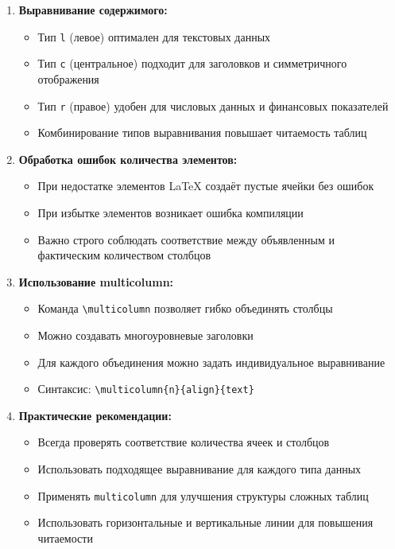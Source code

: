 \documentclass[12pt,a4paper]{article}
\begin{document}
\begin{enumerate}
    \item \textbf{Выравнивание содержимого:}
    \begin{itemize}
        \item Тип \texttt{l} (левое) оптимален для текстовых данных
        \item Тип \texttt{c} (центральное) подходит для заголовков и симметричного отображения
        \item Тип \texttt{r} (правое) удобен для числовых данных и финансовых показателей
        \item Комбинирование типов выравнивания повышает читаемость таблиц
    \end{itemize}
    
    \item \textbf{Обработка ошибок количества элементов:}
    \begin{itemize}
        \item При недостатке элементов LaTeX создаёт пустые ячейки без ошибок
        \item При избытке элементов возникает ошибка компиляции
        \item Важно строго соблюдать соответствие между объявленным и фактическим количеством столбцов
    \end{itemize}
    
    \item \textbf{Использование multicolumn:}
    \begin{itemize}
        \item Команда \texttt{\textbackslash multicolumn} позволяет гибко объединять столбцы
        \item Можно создавать многоуровневые заголовки
        \item Для каждого объединения можно задать индивидуальное выравнивание
        \item Синтаксис: \texttt{\textbackslash multicolumn\{n\}\{align\}\{text\}}
    \end{itemize}
    
    \item \textbf{Практические рекомендации:}
    \begin{itemize}
        \item Всегда проверять соответствие количества ячеек и столбцов
        \item Использовать подходящее выравнивание для каждого типа данных
        \item Применять \texttt{multicolumn} для улучшения структуры сложных таблиц
        \item Использовать горизонтальные и вертикальные линии для повышения читаемости
    \end{itemize}
    

\end{enumerate}
\end{document}
